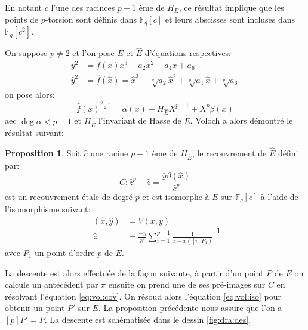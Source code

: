 \documentclass[10pt,a4paper]{book}
\theoremstyle{plain}
\theoremstyle{definition}
\theoremstyle{definition}
\theoremstyle{definition}
\newtheorem{prop}[thm]{Proposition}
\theoremstyle{definition}
\theoremstyle{remark}
\theoremstyle{remark}
\theoremstyle{definition}
\begin{document}
En notant $c$ l'une des racinces $p-1$ ème de $H_E$, ce résultat implique que les points de $p$-torsion sont définis dans $\mathbb{F}_q[c]$ et leurs abscisses sont incluses dans $\mathbb{F}_q[c^2]$.

On suppose $p\neq 2$ et l'on pose $E$ et $\widehat{E}$ 
d'équations respectives:
\begin{equation}
\begin{alignedat}{1}
y^2 &= f(x)x^3+a_2x^2+a_4x+a_6 \\
\widehat{y}^2 &= \widehat{f}(\widehat{x})=\widehat{x}^3+\sqrt[p]{a_2}\widehat{x}^2+\sqrt[p]{a_4}\widehat{x}+\sqrt[p]{a_6}
\end{alignedat}
\end{equation}
on pose alors:
\begin{equation}
\widehat{f}(x)^{\frac{p-1}{2}}=\alpha(x)+H_{\widehat{E}}X^{p-1}+X^{p}\beta(x)
\end{equation}
aec $\deg  \alpha <p-1$ et $H_{\widehat{E}}$ l'invariant de Hasse de $\widehat{E}$. Voloch a alors démontré le résultat suivant:
\begin{prop}
Soit $\widehat{c}$ une racine $p-1$ ème de $H_{\widehat{E}}$, le recouvrement de $\widehat{E}$ défini par:
\begin{equation}
\label{eq:vol:cov}
C:\widehat{z}^p-\widehat{z}=\frac{\widehat{y}\beta( \widehat{x})}{\widehat{c}^p}
\end{equation}
est un recouvrement étale de degré $p$ et est isomorphe à $E$ sur $\mathbb{F}_q[c]$ à l'aide de l'isomorphisme suivant:
\begin{equation}
\label{eq:vol:iso}
\begin{alignedat}{1}
(\widehat{x},\widehat{y}) &= V(x,y) \\
\widehat{z} &= \frac{-y}{\widehat{c}^p}\sum_{i=1}^{p-1}\frac{1}{x-x([i]P_1)}
\end{alignedat}{1}
\end{equation}
avec $P_1$ un point d'ordre $p$ de $E$.
\end{prop}

La descente est alors effectuée de la façon suivante, à partir d'un point $P$ de $E$ on calcule un antécédent par $\pi$ ensuite on prend une de ses pré-images sur $C$ en résolvant l'équation \eqref{eq:vol:cov}. On résoud alors l'équation \eqref{eq:vol:iso} pour obtenir un point $P'$ sur $E$. La proposition précédente nous assure que l'on a $[p]P'=P$. La descente est schématisée dans le dessin \ref{fig:dra:des}.
\end{document}
